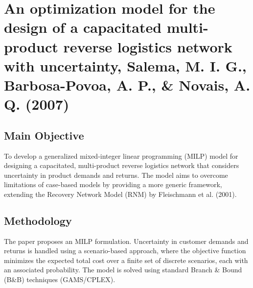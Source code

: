 \section{{An optimization model for the design of a capacitated multi-product reverse logistics network with uncertainty, Salema, M. I. G., Barbosa-Povoa, A. P., \& Novais, A. Q. (2007)}}

\subsection*{Main Objective}
To develop a generalized mixed-integer linear programming (MILP) model for designing a capacitated, multi-product reverse logistics network that considers uncertainty in product demands and returns. The model aims to overcome limitations of case-based models by providing a more generic framework, extending the Recovery Network Model (RNM) by Fleischmann et al. (2001).

\subsection*{Methodology}
The paper proposes an MILP formulation. Uncertainty in customer demands and returns is handled using a scenario-based approach, where the objective function minimizes the expected total cost over a finite set of discrete scenarios, each with an associated probability. The model is solved using standard Branch \& Bound (B\&B) techniques (GAMS/CPLEX).

